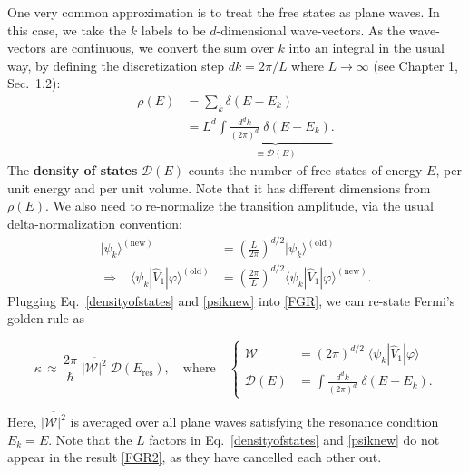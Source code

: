 \documentclass[pra,12pt]{revtex4-2}
\begin{document}
One very common approximation is to treat the free states as plane
waves.  In this case, we take the $k$ labels to be $d$-dimensional
wave-vectors.  As the wave-vectors are continuous, we convert the sum
over $k$ into an integral in the usual way, by defining the
discretization step $dk = 2\pi/L$ where $L \rightarrow \infty$ (see
Chapter 1, Sec.~1.2):
\begin{align}
  \rho(E) &= \sum_k \delta(E-E_k) \nonumber \\
  &= L^d \underbrace{\int \frac{d^d k}{(2\pi)^d} \; \delta(E - E_k).}_{\equiv \displaystyle \mathcal{D}(E)} \label{densityofstates}
\end{align}
The \textbf{density of states} $\mathcal{D}(E)$ counts the number of
free states of energy $E$, per unit energy and per unit volume.  Note
that it has different dimensions from $\rho(E)$.  We also need to
re-normalize the transition amplitude, via the usual
delta-normalization convention:
\begin{align}
  |\psi_k\rangle^{(\textrm{new})}
  &= \left(\frac{L}{2\pi}\right)^{d/2} |\psi_{k}\rangle^{(\textrm{old})} \\
  \Rightarrow \;\;\;
  \langle\psi_{k}| \hat{V}_1|\varphi\rangle^{(\textrm{old})}
  &= \left(\frac{2\pi}{L}\right)^{d/2} \langle\psi_{k}| \hat{V}_1|\varphi\rangle^{(\textrm{new})}.
  \label{psiknew}
\end{align}
Plugging Eq.~\eqref{densityofstates} and \eqref{psiknew} into
\eqref{FGR}, we can re-state Fermi's golden rule as
\begin{framed}
  \begin{equation}
    \kappa
    \,\approx\, \frac{2\pi}{\hbar} \;
    \overline{\big|\mathcal{W}\big|^2} \;
    \mathcal{D}(E_{\mathrm{res}}),
    \quad \mathrm{where} \quad \left\{
    \begin{aligned}
      \mathcal{W}
      &= (2\pi)^{d/2} \;
      \langle\psi_{k}| \hat{V}_1|\varphi\rangle \\
      \mathcal{D}(E) &= \int \frac{d^dk}{(2\pi)^d} \; \delta(E-E_k).
    \end{aligned}\right.
    \label{FGR2}
  \end{equation}
\end{framed}
\vskip -0.1in
\noindent
Here, $\overline{\big|\mathcal{W}\big|^2}$ is averaged over all plane
waves satisfying the resonance condition $E_k = E$.  Note that the $L$
factors in Eq.~\eqref{densityofstates} and \eqref{psiknew} do not
appear in the result \eqref{FGR2}, as they have cancelled each other
out.
\end{document}
